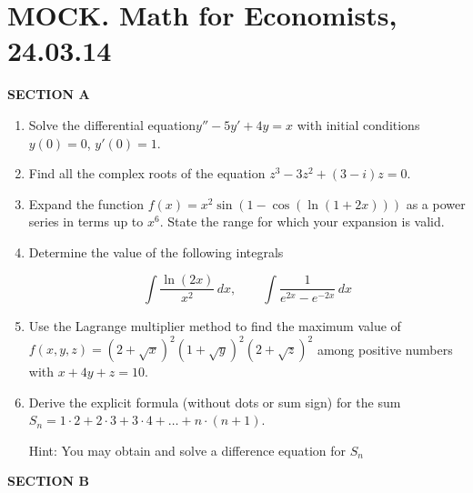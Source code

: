 \documentclass[12pt]{article}
\begin{document}
\section*{MOCK. Math for Economists, 24.03.14}

\textbf{SECTION A}

\begin{enumerate}
\item Solve the differential equation$y''-5y'+4y=x$ with initial conditions $y(0)=0$, $y'(0)=1$. 


\item Find all the complex roots of the equation $z^3-3z^2+(3-i)z=0$. 

\item Expand the function $f(x)=x^2\sin(1-\cos(\ln(1+2x)))$  as a power series in terms up to $x^6$. State the range for which your expansion is valid.

\item Determine the value of the following integrals

\[ 
\int \frac{\ln (2x)}{x^2} \, dx, \qquad \int \frac{1}{e^{2x}-e^{-2x}} \, dx
\]

\item Use the Lagrange multiplier method to find the maximum value of $f(x,y,z)=(2+\sqrt{x})^2(1+\sqrt{y})^2(2+\sqrt{z})^2$ among positive numbers with $x+4y+z=10$.


\item Derive the explicit formula (without dots or sum sign) for the sum $S_n=1\cdot 2+2\cdot 3+3\cdot 4 +\ldots+ n\cdot (n+1)$.

Hint: You may obtain and solve a difference equation for $S_n$



\end{enumerate}

\textbf{SECTION B}
\end{document}
